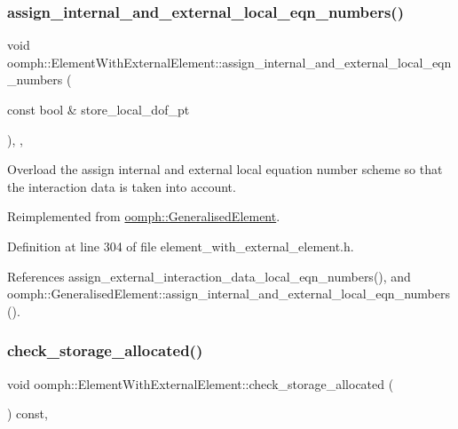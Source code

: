 \subsubsection{\texorpdfstring{assign\+\_\+internal\+\_\+and\+\_\+external\+\_\+local\+\_\+eqn\+\_\+numbers()}{assign\_internal\_and\_external\_local\_eqn\_numbers()}}
{\footnotesize\ttfamily void oomph\+::\+Element\+With\+External\+Element\+::assign\+\_\+internal\+\_\+and\+\_\+external\+\_\+local\+\_\+eqn\+\_\+numbers (\begin{DoxyParamCaption}\item[{const bool \&}]{store\+\_\+local\+\_\+dof\+\_\+pt }\end{DoxyParamCaption})\hspace{0.3cm}{\ttfamily [inline]}, {\ttfamily [protected]}, {\ttfamily [virtual]}}



Overload the assign internal and external local equation number scheme so that the interaction data is taken into account. 



Reimplemented from \hyperlink{classoomph_1_1GeneralisedElement_aa4884467f33b95c17e2e57e592ccd480}{oomph\+::\+Generalised\+Element}.



Definition at line 304 of file element\+\_\+with\+\_\+external\+\_\+element.\+h.



References assign\+\_\+external\+\_\+interaction\+\_\+data\+\_\+local\+\_\+eqn\+\_\+numbers(), and oomph\+::\+Generalised\+Element\+::assign\+\_\+internal\+\_\+and\+\_\+external\+\_\+local\+\_\+eqn\+\_\+numbers().

\mbox{\label{classoomph_1_1ElementWithExternalElement_a6fd8c3cb72d4feedeb8750d830f66222}} 
\subsubsection{\texorpdfstring{check\+\_\+storage\+\_\+allocated()}{check\_storage\_allocated()}}
{\footnotesize\ttfamily void oomph\+::\+Element\+With\+External\+Element\+::check\+\_\+storage\+\_\+allocated (\begin{DoxyParamCaption}{ }\end{DoxyParamCaption}) const\hspace{0.3cm}{\ttfamily [inline]}, {\ttfamily [private]}}



